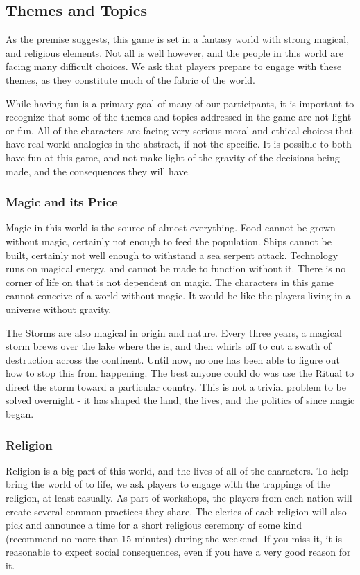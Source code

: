 \documentclass[sheet]{GL2020}
\begin{document}
\subsection{Themes and Topics}
As the premise suggests, this game is set in a fantasy world with strong magical, and religious elements. Not all is well however, and the people in this world are facing many difficult choices. We ask that players prepare to engage with these themes, as they constitute much of the fabric of the world.

While having fun is a primary goal of many of our participants, it is important to recognize that some of the themes and topics addressed in the game are not light or fun. All of the characters are facing very serious moral and ethical choices that have real world analogies in the abstract, if not the specific. It is possible to both have fun at this game, and not make light of the gravity of the decisions being made, and the consequences they will have.

\subsubsection{Magic and its Price}
Magic in this world is the source of almost everything. Food cannot be grown without magic, certainly not enough to feed the population. Ships cannot be built, certainly not well enough to withstand a sea serpent attack. Technology runs on magical energy, and cannot be made to function without it. There is no corner of life on \pEarth{} that is not dependent on magic. The characters in this game cannot conceive of a world without magic. It would be like the players living in a universe without gravity.

The Storms are also magical in origin and nature. Every three years, a magical storm brews over the lake where the \pSc{} is, and then whirls off to cut a swath of destruction across the continent. Until now, no one has been able to figure out how to stop this from happening. The best anyone could do was use the Ritual to direct the storm toward a particular country. This is not a trivial problem to be solved overnight - it has shaped the land, the lives, and the politics of \pEarth{} since magic began.

\subsubsection{Religion}
Religion is a big part of this world, and the lives of all of the characters. To help bring the world of \pEarth{} to life, we ask players to engage with the trappings of the religion, at least casually. As part of workshops, the players from each nation will create several common practices they share. The clerics of each religion will also pick and announce a time for a short religious ceremony of some kind (recommend no more than 15 minutes) during the weekend. If you miss it, it is reasonable to expect social consequences, even if you have a very good reason for it.
\end{document}
